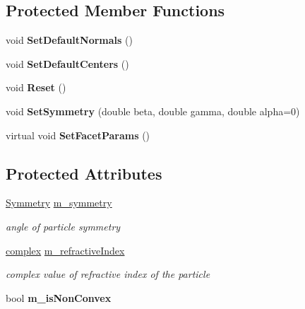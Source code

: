 \subsection*{Protected Member Functions}
\begin{DoxyCompactItemize}
\item 
\mbox{\label{class_particle_a8df38703bbda2e838467a51a650624dc}} 
void {\bfseries Set\+Default\+Normals} ()
\item 
\mbox{\label{class_particle_ab48482d12c9e0cf4eaa3a23ba9931d44}} 
void {\bfseries Set\+Default\+Centers} ()
\item 
\mbox{\label{class_particle_a77d1dccca2dc8b6c2f28025256f681b8}} 
void {\bfseries Reset} ()
\item 
\mbox{\label{class_particle_af7f8367651719a52accf283d433140bd}} 
void {\bfseries Set\+Symmetry} (double beta, double gamma, double alpha=0)
\item 
\mbox{\label{class_particle_a33bf0c9eb07d48eb3e0c218554f3e20d}} 
virtual void {\bfseries Set\+Facet\+Params} ()
\end{DoxyCompactItemize}
\subsection*{Protected Attributes}
\begin{DoxyCompactItemize}
\item 
\mbox{\label{class_particle_af8aaf3ce5bd6c6525543b98a23fb44a0}} 
\mbox{\hyperlink{class_orientation}{Symmetry}} \mbox{\hyperlink{class_particle_af8aaf3ce5bd6c6525543b98a23fb44a0}{m\+\_\+symmetry}}
\begin{DoxyCompactList}\small\item\em angle of particle symmetry \end{DoxyCompactList}\item 
\mbox{\label{class_particle_a2285c983db1931fd823a44d104ddb578}} 
\mbox{\hyperlink{classcomplex}{complex}} \mbox{\hyperlink{class_particle_a2285c983db1931fd823a44d104ddb578}{m\+\_\+refractive\+Index}}
\begin{DoxyCompactList}\small\item\em complex value of refractive index of the particle \end{DoxyCompactList}\item 
\mbox{\label{class_particle_a95ebda6d49685a57da79d849fca898ab}} 
bool {\bfseries m\+\_\+is\+Non\+Convex}
\end{DoxyCompactItemize}


